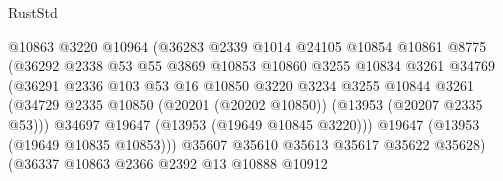 \begin{lexlean}{RustStd}
\begin{coremodule}
                                    @10863
                                    @3220
                                    @10964
                                    (@36283
                                      @2339
                                      @1014
                                      @24105
                                      @10854
                                      @10861
                                      @8775
                                      (@36292
                                        @2338
                                        @53
                                        @55
                                        @3869
                                        @10853
                                        @10860
                                        @3255
                                        @10834
                                        @3261
                                        @34769
                                        (@36291
                                          @2336
                                          @103
                                          @53
                                          @16
                                          @10850
                                          @3220
                                          @3234
                                          @3255
                                          @10844
                                          @3261
                                          (@34729
                                            @2335
                                            @10850
                                            (@20201 (@20202 @10850))
                                            (@13953 (@20207 @2335 @53)))
                                          @34697
                                          @19647
                                          (@13953 (@19649 @10845 @3220)))
                                        @19647
                                        (@13953 (@19649 @10835 @10853)))
                                      @35607
                                      @35610
                                      @35613
                                      @35617
                                      @35622
                                      @35628)
                                    (@36337
                                      @10863
                                      @2366
                                      @2392
                                      @13
                                      @10888
                                      @10912

\end{coremodule}
\end{lexlean}
